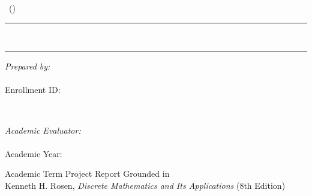 \documentclass[11pt,a4paper,oneside]{report}
\begin{document}
\begin{titlepage}
    \centering
    \vspace*{1.0cm}
    
    {\scshape\Large \DocUniversity \par}
    \vspace{0.3cm}
    {\scshape\large \DocFaculty \par}
    \vspace{0.3cm}
    {\large \DocCourse\ (\DocCourseCode) \par}
    
    \vspace{1.5cm}
    \rule{\linewidth}{1.2pt}\\[0.4cm]
    {\huge\bfseries\color{primaryblue} \DocTitle \par}
    \vspace{0.3cm}
    {\large\itshape \DocSubtitle \par}
    \rule{\linewidth}{1.2pt}
    
    \vspace{2.0cm}
    
    \begin{minipage}{0.48\textwidth}
        \begin{flushleft} \large
            \emph{Prepared by:}\\
            \textbf{\DocAuthor}\\
            Enrollment ID: \texttt{\DocRollNumber}
        \end{flushleft}
    \end{minipage}
    ~
    \begin{minipage}{0.48\textwidth}
        \begin{flushright} \large
            \emph{Academic Evaluator:}\\
            \textbf{\DocSupervisor}\\
            Academic Year: \DocAcademicYear
        \end{flushright}
    \end{minipage}
    
    \vfill
    
    {\large Academic Term Project Report Grounded in\\
    Kenneth H. Rosen, \emph{Discrete Mathematics and Its Applications} (8th Edition)\par}
    \vspace{0.5cm}
    {\large \DocSubmissionDate \par}
\end{titlepage}
\end{document}
